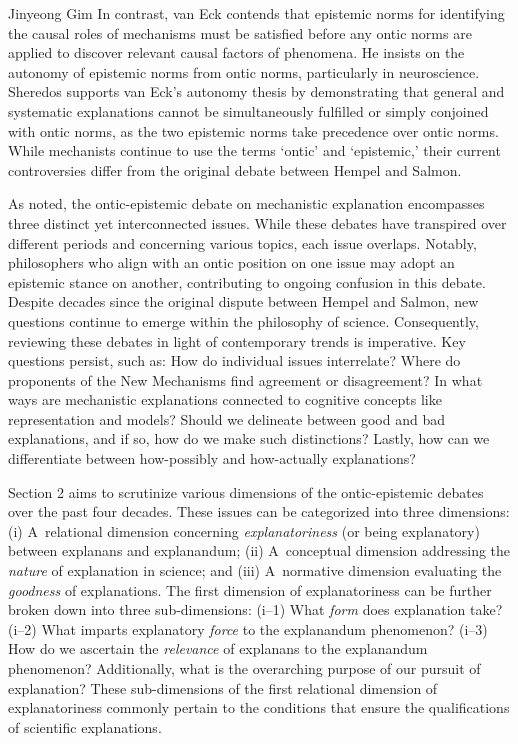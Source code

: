 \begin{artengenv}{Jinyeong Gim}
In contrast, van Eck
\parencite*[][]{van_eck_reconciling_2015} %
 contends that epistemic norms for identifying the causal roles of mechanisms must be satisfied before any ontic norms are applied to discover relevant causal factors of phenomena. He insists on the autonomy of epistemic norms from ontic norms, particularly in neuroscience. Sheredos 
\parencite*[][]{sheredos_re-reconciling_2016} %
 supports van Eck's autonomy thesis by demonstrating that general and systematic explanations cannot be simultaneously fulfilled or simply conjoined with ontic norms, as the two epistemic norms take precedence over ontic norms. While mechanists continue to use the terms ‘ontic' and ‘epistemic,' their current controversies differ from the original debate between Hempel and Salmon.

As noted, the ontic-epistemic debate on mechanistic explanation encompasses three distinct yet interconnected issues. While these debates have transpired over different periods and concerning various topics, each issue overlaps. Notably, philosophers who align with an ontic position on one issue may adopt an epistemic stance on another, contributing to ongoing confusion in this debate. Despite decades since the original dispute between Hempel and Salmon, new questions continue to emerge within the philosophy of science. Consequently, reviewing these debates in light of contemporary trends is imperative. Key questions persist, such as: How do individual issues interrelate? Where do proponents of the New Mechanisms find agreement or disagreement? In what ways are mechanistic explanations connected to cognitive concepts like representation and models? Should we delineate between good and bad explanations, and if so, how do we make such distinctions? Lastly, how can we differentiate between how-possibly and how-actually explanations?

Section 2 aims to scrutinize various dimensions of the ontic-epistemic debates over the past four decades. These issues can be categorized into three dimensions: (i) A~relational dimension concerning \textit{explanatoriness} (or being explanatory) between explanans and explanandum; (ii) A~conceptual dimension addressing the \textit{nature} of explanation in science; and (iii) A~normative dimension evaluating the \textit{goodness} of explanations. The first dimension of explanatoriness can be further broken down into three sub-dimensions: (i--1) What \textit{form} does explanation take? (i--2) What imparts explanatory \textit{force} to the explanandum phenomenon? (i--3) How do we ascertain the \textit{relevance} of explanans to the explanandum phenomenon? Additionally, what is the overarching purpose of our pursuit of explanation? These sub-dimensions of the first relational dimension of explanatoriness commonly pertain to the conditions that ensure the qualifications of scientific explanations.


\end{artengenv}
